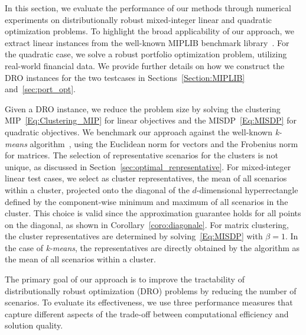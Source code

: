 \documentclass{article}
\begin{document}
In this section, we evaluate the performance of our methods through numerical experiments on distributionally robust mixed-integer linear and quadratic optimization problems.
To highlight the broad applicability of our approach, we extract linear instances from the well-known MIPLIB benchmark library~\cite{furini2018online}.
For the quadratic case, we solve a robust portfolio optimization problem, utilizing real-world financial data.
We provide further details on how we construct the DRO instances for the two testcases in Sections~\ref{Section:MIPLIB} and~\ref{sec:port_opt}.

Given a DRO instance, we reduce the problem size by solving the clustering MIP~\eqref{Eq:Clustering_MIP} for linear objectives and the MISDP~\eqref{Eq:MISDP} for quadratic objectives.
We benchmark our approach against the well-known \emph{k-means} algorithm~\cite{kmeans_macqueen}, using the Euclidean norm for vectors and the Frobenius norm for matrices. %
The selection of representative scenarios for the clusters is not unique, as discussed in Section~\ref{sec:optimal_representative}.
For mixed-integer linear test cases, we select as cluster representatives, the mean of all scenarios within a cluster, projected onto the diagonal of the \( d \)-dimensional hyperrectangle defined by the component-wise minimum and maximum of all scenarios in the cluster.
This choice is valid since the approximation guarantee holds for all points on the diagonal, as shown in Corollary~\ref{coro:diagonale}.
For matrix clustering, the cluster representatives are determined by solving~\eqref{Eq:MISDP} with \(\beta=1\).
In the case of \emph{k-means}, the representatives are directly obtained by the algorithm as the mean of all scenarios within a cluster.

The primary goal of our approach is to improve the tractability of distributionally robust optimization (DRO) problems by reducing the number of scenarios.
To evaluate its effectiveness, we use three performance measures that capture different aspects of the trade-off between computational efficiency and solution quality.
\end{document}
